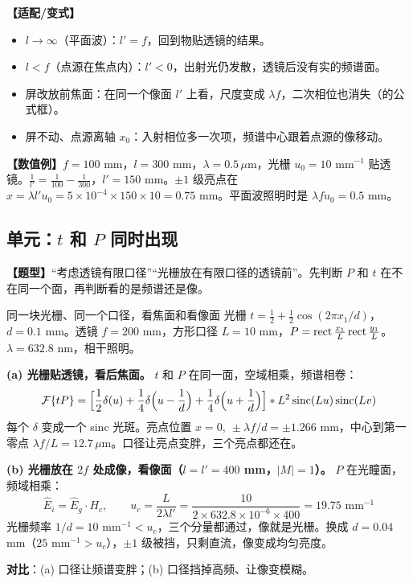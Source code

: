 \textbf{【适配/变式】}
\begin{itemize}
\item $l\to\infty$（平面波）：$l'=f$，回到物贴透镜的结果。
\item $l<f$（点源在焦点内）：$l'<0$，出射光仍发散，透镜后没有实的频谱面。
\item 屏改放前焦面：在同一个像面 $l'$ 上看，尺度变成 $\lambda f$，二次相位也消失（\pageref{sec:lensFT}的公式框）。
\item 屏不动、点源离轴 $x_0$：入射相位多一次项，频谱中心跟着点源的像移动。
\end{itemize}

\textbf{【数值例】}$f=100$ mm，$l=300$ mm，$\lambda=0.5\,\mu$m，光栅 $u_0=10$ mm$^{-1}$ 贴透镜。$\frac1{l'}=\frac1{100}-\frac1{300}$，$l'=150$ mm。$\pm1$ 级亮点在 $x=\lambda l'u_0=5\times10^{-4}\times150\times10=0.75$ mm。平面波照明时是 $\lambda fu_0=0.5$ mm。

\subsection*{单元：$t$ 和 $P$ 同时出现}\label{sec:tandP}
\textbf{【题型】}“考虑透镜有限口径”“光栅放在有限口径的透镜前”。先判断 $P$ 和 $t$ 在不在同一个面，再判断看的是频谱还是像。

\begin{exam}{同一块光栅、同一个口径，看焦面和看像面}
光栅 $t=\frac12+\frac12\cos(2\pi x_1/d)$，$d=0.1$ mm。透镜 $f=200$ mm，方形口径 $L=10$ mm，$P=\operatorname{rect}\frac{x_1}{L}\operatorname{rect}\frac{y_1}{L}$。$\lambda=632.8$ nm，相干照明。

\textbf{(a) 光栅贴透镜，看后焦面。} $t$ 和 $P$ 在同一面，空域相乘，频谱相卷：
\[
\mathcal{F}\{tP\}=\Big[\frac12\delta(u)+\frac14\delta\Big(u-\frac1d\Big)+\frac14\delta\Big(u+\frac1d\Big)\Big]\ast L^2\operatorname{sinc}(Lu)\operatorname{sinc}(Lv)
\]
每个 $\delta$ 变成一个 sinc 光斑。亮点位置 $x=0,\ \pm\lambda f/d=\pm1.266$ mm，中心到第一零点 $\lambda f/L=12.7\,\mu$m。口径让亮点变胖，三个亮点都还在。

\textbf{(b) 光栅放在 $2f$ 处成像，看像面（$l=l'=400$ mm，$|M|=1$）。} $P$ 在光瞳面，频域相乘：
\[
\hat E_i=\hat E_g\cdot H_c,\qquad u_c=\frac{L}{2\lambda l'}=\frac{10}{2\times632.8\times10^{-6}\times400}=19.75\text{ mm}^{-1}
\]
光栅频率 $1/d=10$ mm$^{-1}<u_c$，三个分量都通过，像就是光栅。换成 $d=0.04$ mm（$25$ mm$^{-1}>u_c$），$\pm1$ 级被挡，只剩直流，像变成均匀亮度。

\textbf{对比}：(a) 口径让频谱变胖；(b) 口径挡掉高频、让像变模糊。
\end{exam}

